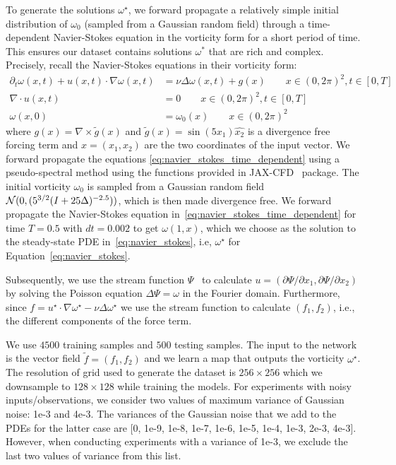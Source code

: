 To generate the solutions $\omega^\star$, we forward propagate a relatively simple initial distribution of $\omega_0$ (sampled from a Gaussian random field) through a
time-dependent Navier-Stokes equation in the vorticity form for a short period of time. This ensures our dataset contains solutions $\omega^*$ that are rich and complex.  Precisely, recall the Navier-Stokes equations in their vorticity form:
\begin{equation}
\label{eq:navier_stokes_time_dependent}
\begin{split}
    \partial_t \omega(x,t) + u(x,t) \cdot \nabla \omega(x,t)
    &= \nu \Delta \omega(x,t) + g(x)  \qquad x \in (0, 2\pi)^2, t \in [0, T]\\
    \nabla \cdot u(x,t) &= 0 \qquad x \in (0, 2\pi)^2, t \in [0, T]\\
    \omega(x, 0) &= \omega_0(x) \qquad x \in (0, 2\pi)^2
\end{split}
\end{equation}
where $g(x) = \nabla \times \tilde{g}(x)$ and 
$\tilde{g}(x) = \sin(5x_1)\hat{x_2}$ 
is a divergence free forcing term and $x = (x_1, x_2)$ are the two coordinates of the input vector.
We forward propagate the equations \eqref{eq:navier_stokes_time_dependent}
using a pseudo-spectral method
using the functions provided in JAX-CFD~\citep{kochkov2021machine,Dresdner2022-Spectral-ML} package. 
The initial vorticity $\omega_0$ is sampled from a 
Gaussian random field ${\mathcal{N}}(0, (5^{3/2}(I + 25\Delta)^{-2.5}))$, which is then made divergence free.
We forward propagate the Navier-Stokes equation in~\eqref{eq:navier_stokes_time_dependent}
for time $T = 0.5$ with $dt=0.002$ to get $\omega(1, x)$, 
which we choose as the solution to the steady-state PDE in~\eqref{eq:navier_stokes}, i.e, $\omega^\star$
for Equation~\ref{eq:navier_stokes}.

Subsequently, we use the stream function 
$\Psi$~\citep{batchelor1967introduction} to calculate 
$u = \left(\partial \Psi/\partial x_1, \partial \Psi/\partial x_2\right)$ 
by solving the Poisson equation $\Delta \Psi = \omega$ 
in the Fourier domain.
Furthermore, since 
$f = u^\star \cdot \nabla \omega^\star - \nu \Delta \omega^\star$
we use the stream function to calculate $(f_1, f_2)$, i.e., the different components of the force term.

We use $4500$ training samples and $500$ testing samples.
The input to the network is the vector field $\tilde{f} = (f_1, f_2)$ 
and we learn a map that outputs the vorticity $\omega^\star$.
The resolution of grid used to generate the dataset is $256 \times 256$ 
which we downsample to $128 \times 128$ while training the models. For experiments with noisy inputs/observations, we consider two values of maximum  variance of Gaussian noise: 1e-3 and 4e-3. 
The variances of the Gaussian noise that we add to the PDEs for the latter case are [0, 1e-9, 1e-8, 1e-7, 1e-6, 1e-5, 1e-4, 1e-3, 2e-3, 4e-3].
However, when conducting experiments with a variance of 1e-3, we exclude the last two values of variance from this list.




